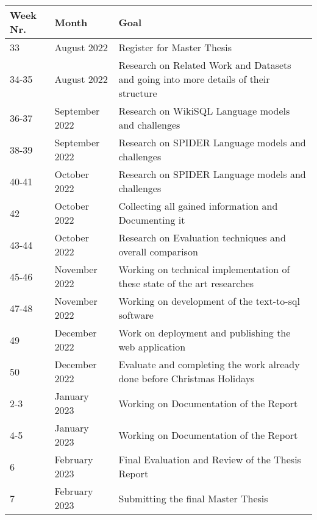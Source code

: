 \begin{table}[!ht]
    \centering
    \begin{tabular}{|l|l|p{10cm}|}
        \hline
        Week Nr. & Month          & Goal                                                                                 \\ \hline
        33       & August 2022    & Register for Master Thesis                                                           \\ \hline
        34-35    & August 2022    & Research on Related Work and Datasets and going into more details of their structure \\ \hline
        36-37    & September 2022 & Research on WikiSQL Language models and challenges                                   \\ \hline
        38-39    & September 2022 & Research on SPIDER Language models and challenges                                    \\ \hline
        40-41    & October 2022   & Research on SPIDER Language models and challenges                                    \\ \hline
        42       & October 2022   & Collecting all gained information and Documenting it                                 \\ \hline
        43-44    & October 2022   & Research on Evaluation techniques and overall comparison                             \\ \hline
        45-46    & November 2022  & Working on technical implementation of these state of the art researches             \\ \hline
        47-48    & November 2022  & Working on development of the text-to-sql software                                   \\ \hline
        49       & December 2022  & Work on deployment and publishing the web application                                \\ \hline
        50       & December 2022  & Evaluate and completing the work already done before Christmas Holidays              \\ \hline
        2-3      & January 2023   & Working on Documentation of the Report                                               \\ \hline
        4-5      & January 2023   & Working on Documentation of the Report                                               \\ \hline
        6        & February 2023  & Final Evaluation and Review of the Thesis Report                                     \\ \hline
        7        & February 2023  & Submitting the final Master Thesis                                                   \\ \hline
    \end{tabular}
\end{table}
